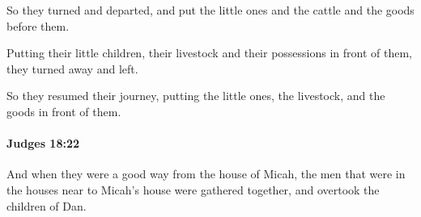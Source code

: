 			\begin{versebox}
					\item[BHS] 
					\item[ASV] So they turned and departed, and put the little ones and the cattle and the goods before them.
					\item[NIV] Putting their little children, their livestock and their possessions in front of them, they turned away and left.
					\item[NRSV] So they resumed their journey, putting the little ones, the livestock, and the goods in front of them.
			\end{versebox}

		\paragraph{Judges 18:22} %
			\label{JUDGES-18-22}

			And when they were a good way from the house of Micah, the men that were in the houses near to Micah’s house were gathered together, and overtook the children of Dan.

